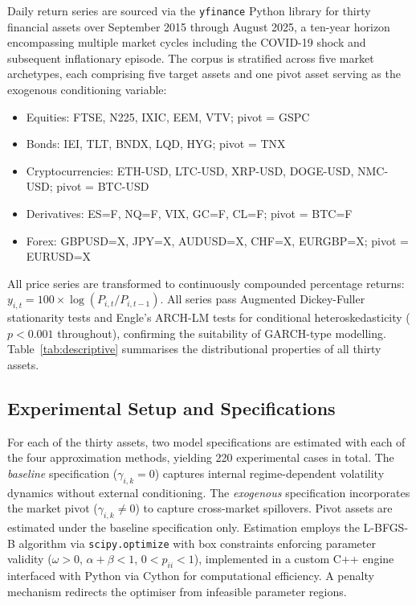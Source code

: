 \documentclass[12pt, a4paper]{article}
\begin{document}
Daily return series are sourced via the \texttt{yfinance} Python library for thirty financial assets over September 2015 through August 2025, a ten-year horizon encompassing multiple market cycles including the COVID-19 shock and subsequent inflationary episode. The corpus is stratified across five market archetypes, each comprising five target assets and one pivot asset serving as the exogenous conditioning variable:
\begin{itemize}[noitemsep, topsep=3pt, leftmargin=1.5em]
  \item Equities: FTSE, N225, IXIC, EEM, VTV; pivot = GSPC
  \item Bonds: IEI, TLT, BNDX, LQD, HYG; pivot = TNX
  \item Cryptocurrencies: ETH-USD, LTC-USD, XRP-USD, DOGE-USD, NMC-USD; pivot = BTC-USD
  \item Derivatives: ES=F, NQ=F, VIX, GC=F, CL=F; pivot = BTC=F
  \item Forex: GBPUSD=X, JPY=X, AUDUSD=X, CHF=X, EURGBP=X; pivot = EURUSD=X
\end{itemize}

All price series are transformed to continuously compounded percentage returns: $y_{i,t} = 100 \times \log(P_{i,t}/P_{i,t-1})$. All series pass Augmented Dickey-Fuller stationarity tests and Engle's ARCH-LM tests for conditional heteroskedasticity ($p < 0.001$ throughout), confirming the suitability of GARCH-type modelling. Table~\ref{tab:descriptive} summarises the distributional properties of all thirty assets.

\subsection{Experimental Setup and Specifications}

For each of the thirty assets, two model specifications are estimated with each of the four approximation methods, yielding 220 experimental cases in total. The \textit{baseline} specification ($\gamma_{i,k} = 0$) captures internal regime-dependent volatility dynamics without external conditioning. The \textit{exogenous} specification incorporates the market pivot ($\gamma_{i,k} \ne 0$) to capture cross-market spillovers. Pivot assets are estimated under the baseline specification only. Estimation employs the L-BFGS-B algorithm via \texttt{scipy.optimize} with box constraints enforcing parameter validity ($\omega > 0$, $\alpha + \beta < 1$, $0 < p_{ii} < 1$), implemented in a custom C++ engine interfaced with Python via Cython for computational efficiency. A penalty mechanism redirects the optimiser from infeasible parameter regions.
\end{document}
